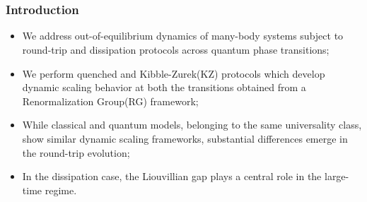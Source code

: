 \section[Introduction]{}

\begin{frame}
      \frametitle{Introduction}
      \begin{itemize}
      	\item
      		We address out-of-equilibrium dynamics of many-body systems
      		subject to  round-trip and dissipation protocols across
      		 quantum phase transitions;
      	\medskip
      	\medskip
      	\medskip
      	\medskip
      	
      	\item
      		We perform quenched and Kibble-Zurek(KZ) protocols which
      		develop dynamic scaling 
      		behavior at both the transitions obtained from a Renormalization 
      		Group(RG) framework;
      		
      	\medskip
      	\medskip
      	\medskip
      	\medskip
      	
      	\item
      		While classical and quantum models, belonging to the same
      		universality class, show similar dynamic scaling frameworks, 
      		substantial differences emerge in the round-trip evolution;
      		
     	\medskip
      	\medskip
      	\medskip
      	\medskip

      	\item
      		In the dissipation case, the Liouvillian gap plays a central role
      		in the large-time regime.
      \end{itemize}
\end{frame}




